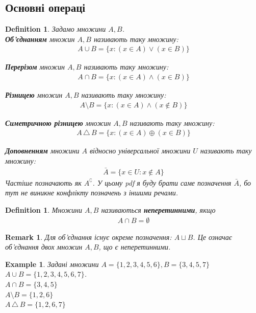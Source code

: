 \documentclass[a4paper, 14pt]{extarticle}
\theoremstyle{theoremdd}
\theoremstyle{theoremdd}
\newtheorem{definition}[theorem]{Definition}
\theoremstyle{theoremdd}
\theoremstyle{theoremdd}
\theoremstyle{theoremdd}
\newtheorem{example}[theorem]{Example}
\theoremstyle{theoremdd}
\theoremstyle{theoremdd}
\theoremstyle{theoremdd}
\theoremstyle{theoremdd}
\theoremstyle{theoremdd}
\theoremstyle{theoremdd}
\newtheorem{remark}[theorem]{Remark}
\theoremstyle{theoremdd}
\theoremstyle{theoremdd}
\theoremstyle{theoremdd}
\theoremstyle{theoremdd}
\newcommand{\symdif}{\,\triangle\,} %
\begin{document}
\subsection{Основні операці}
\begin{definition}
Задамо множини $A,B$.\\
\textbf{Об'єднанням} множин $A,B$ називають таку множину:
\begin{align*}
A \cup B = \{x: (x \in  A) \vee (x \in B) \}
\end{align*}

\textbf{Перерізом} множин $A,B$ називають таку множину:
\begin{align*}
A \cap B = \{x: (x \in  A) \wedge (x \in B) \}
\end{align*}

\textbf{Різницею} множин $A,B$ називають таку множину:
\begin{align*}
A \setminus B = \{x: (x \in A) \wedge (x \not\in B)\}
\end{align*}

\textbf{Симетричною різницею} множин $A,B$ називають таку множину:
\begin{align*}
A \symdif B = \{x: (x \in A) \oplus (x \in B)\}
\end{align*}

\textbf{Доповненням} множини $A$ відносно універсальної множини $U$ називають таку множину:
\begin{align*}
\bar{A} = \{x \in U: x \not\in A\}
\end{align*}
Частіше позначають як $A^\complement$. У цьому pdf я буду брати саме позначення $\bar{A}$, бо тут не виникне конфлікту позначень з іншими речами.
\end{definition}

\begin{definition}
Множини $A,B$ називаються \textbf{неперетинними}, якщо 
\begin{align*}
A \cap B = \emptyset
\end{align*}
\end{definition}

\begin{remark}
Для об'єднання існує окреме позначення: $A \sqcup B$. Це означає об'єднання двох множин $A,B$, що є неперетинними.
\end{remark}

\begin{example}
Задані множини $A = \{1,2,3,4,5,6\}, B = \{3,4,5,7\}$\\
$A \cup B = \{1,2,3,4,5,6,7\}$.\\
$A \cap B = \{3,4,5\}$\\
$A \setminus B = \{1,2,6\}$\\
$A \symdif B = \{1,2,6,7\}$
\end{example}
\end{document}

